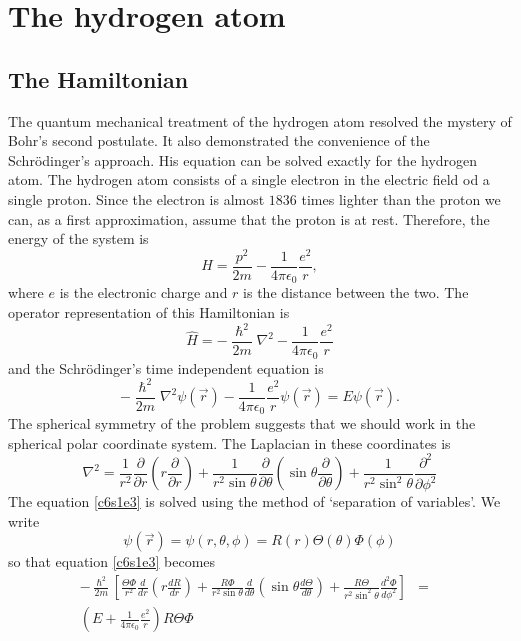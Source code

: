 \chapter{The hydrogen atom}\label{c6}
\section{The Hamiltonian}\label{c6s1}
The quantum mechanical treatment of the hydrogen atom resolved the mystery of 
Bohr's second postulate. It also demonstrated the convenience of the 
Schr\"{o}dinger's approach. His equation can be solved exactly for the hydrogen
atom. The hydrogen atom consists of a single electron in the electric field od a
single proton. Since the electron is almost $1836$ times lighter than the proton
we can, as a first approximation, assume that the proton is at rest. Therefore, 
the energy of the system is
\begin{equation}\label{c6s1e1}
H = \frac{p^2}{2m} - \frac{1}{4\pi\epsilon_0}\frac{e^2}{r},
\end{equation}
where $e$ is the electronic charge and $r$ is the distance between the two. The
operator representation of this Hamiltonian is
\begin{equation}\label{c6s1e2}
\hat{H} = -\frac{\hslash^2}{2m}\nabla^2 - \frac{1}{4\pi\epsilon_0}\frac{e^2}{r}
\end{equation}
and the Schr\"{o}dinger's time independent equation is
\begin{equation}\label{c6s1e3}
-\frac{\hslash^2}{2m}\nabla^2\psi(\vec{r}) - 
\frac{1}{4\pi\epsilon_0}\frac{e^2}{r}\psi(\vec{r}) = E\psi(\vec{r}).
\end{equation}
The spherical symmetry of the problem suggests that we should work in the 
spherical polar coordinate system. The Laplacian in these coordinates is
\begin{equation}\label{c6s1e4}
\nabla^2 = \frac{1}{r^2}\frac{\partial}{\partial r}
\left(r\frac{\partial}{\partial r}\right) + 
\frac{1}{r^2\sin\theta}\frac{\partial}{\partial\theta}
\left(\sin\theta\frac{\partial}{\partial\theta}\right) + 
\frac{1}{r^2\sin^2\theta}\frac{\partial^2}{\partial\phi^2}
\end{equation}
The equation \eqref{c6s1e3} is solved using the method of `separation of 
variables'. We write
\begin{equation}\label{c6s1e5}
\psi(\vec{r}) = \psi(r, \theta, \phi) = R(r)\Theta(\theta)\Phi(\phi)
\end{equation}
so that equation \eqref{c6s1e3} becomes
\begin{eqnarray}
-\frac{\hslash^2}{2m}\left[
\frac{\Theta\Phi}{r^2}\frac{d}{dr}\left(r\frac{dR}{dr}\right) +
\frac{R\Phi}{r^2\sin\theta}\frac{d}{d\theta}
\left(\sin\theta\frac{d\Theta}{d\theta}\right) + 
\frac{R\Theta}{r^2\sin^2\theta}\frac{d^2\Phi}{d\phi^2}\right] &=& \nonumber \\ 
\left(E + \frac{1}{4\pi\epsilon_0}\frac{e^2}{r}\right)R\Theta\Phi & & 
\label{c6s1e6}
\end{eqnarray}
